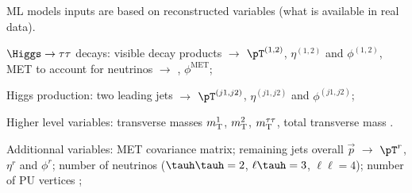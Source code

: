 \begin{frame}%

\manip ML models inputs are based on reconstructed variables (what is available in real data).

\pause
\manip $\Higgs\to\tau\tau$ decays:
\submanip visible decay products $\to$ $\pT^{(1,2)}$, $\eta^{(1,2)}$ and $\phi^{(1,2)}$,
\submanip MET to account for neutrinos $\to$ \MET, $\phi^\text{MET}$;

\pause
\manip Higgs production:
\submanip two leading jets $\to$ $\pT^{(j1,j2)}$, $\eta^{(j1,j2)}$ and $\phi^{(j1,j2)}$;

\pause
\manip Higher level variables:
\submanip transverse masses $m_{\mathrm{T}}^1$, $m_{\mathrm{T}}^2$, $m_{\mathrm{T}}^{\tau\tau}$,
\submanip total transverse mass \mTtot.

\pause
\manip Additionnal variables:
\submanip MET covariance matrix;
\submanip remaining jets overall $\vec{p}$ $\to$ $\pT^r$, $\eta^r$ and $\phi^r$;
\submanip number of neutrinos ($\tauh\tauh = 2$, $\ell\tauh=3$, $\ell\ell=4$);
\submanip number of PU vertices ;

%

\end{frame}
